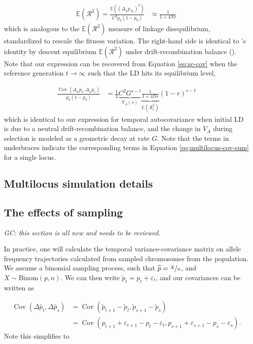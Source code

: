 \documentclass[11pt]{article}
\newcommand{\vb}[1]{{\it \color{blue} #1}}
\newcommand{\E}{\mathbb{E}}
\DeclareMathOperator{\cov}{Cov}
\begin{document}
\begin{align}
  \E(\mathcal{R}^2) = \frac{\E((\Delta_{_H} p_\infty)^2)}{C^2 p_0(1-p_0)} &\approx \frac{1}{1 + 4Nr}
\end{align}
%
which is analogous to the $\E(\mathcal{R}^2)$ measure of linkage disequilibrium,
standardized to rescale the fitness variation. The right-hand side is identical
to \citeauthor{Sved1971-dv}'s identity by descent equilibrium $\E(\mathcal{R}^2)$ under
drift-recombination balance (\citeyear{Sved1971-dv}). Note that our expression
can be recovered from Equation \eqref{eq:sc-cov} when the reference generation
$t \to \infty$ such that the LD hits its equilibrium level,

\begin{align}
  \frac{\cov(\Delta_{_H} p_t, \Delta_{_H} p_s)}{p_0(1-p_0)} &= \frac{1}{2} \underbrace{C^2 G^{s-t}}_{V_A(s)} \underbrace{\frac{1}{1 + 4Nr}}_{\E(\mathcal{R}_t^2)} (1-r)^{s-t}
\end{align}
%
which is identical to our expression for temporal autocovariance when initial
LD is due to a neutral drift-recombination balance, and the change in $V_A$
during selection is modeled as a geometric decay at rate $G$.  Note that the
terms in underbraces indicate the corresponding terms in Equation
\eqref{eq:multilocus-cov-sum} for a single locus.

\subsection{Multilocus simulation details}
\label{sec:supp-ml-sim}

\subsection{The effects of sampling}
\label{sec:sampling}

\vb{GC: this section is all new and needs to be reviewed.}

In practice, one will calculate the temporal variance-covariance matrix on
allele frequency trajectories calculated from sampled chromosomes from the
population. We assume a binomial sampling process, such that $\widetilde{p} =
\nicefrac{X}{n}$, and $X \sim \textrm{Binom}(p, n)$. We can then write
$\widetilde{p}_t = p_t + \varepsilon_t$, and our covariances can be written as

\begin{align}
  \cov(\Delta \widetilde{p_t}, \Delta \widetilde{p_s}) &= \cov(\widetilde{p}_{t+1} - \widetilde{p}_{t}, \widetilde{p}_{s+1} - \widetilde{p}_{s}) \nonumber \\
  &= \cov(p_{t+1} + \varepsilon_{t+1} - p_{t} - \varepsilon_{t}, p_{s+1} + \varepsilon_{s+1} - p_{s} - \varepsilon_{s}).
\end{align}
%
Note this simplifies to
\end{document}
